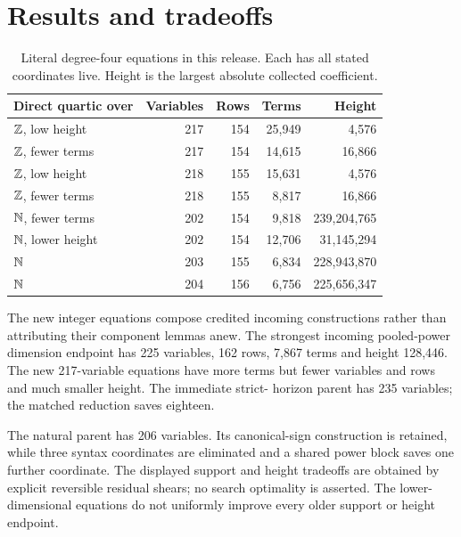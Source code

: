 \section{Results and tradeoffs}
\begin{table}[ht]
\centering\small
\begin{tabular}{lrrrr}
\toprule
Direct quartic over & Variables & Rows & Terms & Height\\
\midrule
$\mathbb Z$, low height &217&154&25,949&4,576\\
$\mathbb Z$, fewer terms &217&154&14,615&16,866\\
$\mathbb Z$, low height &218&155&15,631&4,576\\
$\mathbb Z$, fewer terms &218&155&8,817&16,866\\
$\mathbb N$, fewer terms &202&154&9,818&239,204,765\\
$\mathbb N$, lower height &202&154&12,706&31,145,294\\
$\mathbb N$ &203&155&6,834&228,943,870\\
$\mathbb N$ &204&156&6,756&225,656,347\\
\bottomrule
\end{tabular}
\caption{Literal degree-four equations in this release. Each has all stated
coordinates live. Height is the largest absolute collected coefficient.}
\end{table}
The new integer equations compose credited incoming constructions rather
than attributing their component lemmas anew. The strongest incoming
pooled-power dimension endpoint has 225 variables, 162 rows, 7,867 terms
and height 128,446. The new 217-variable equations have more terms but
fewer variables and rows and much smaller height. The immediate strict-
horizon parent has 235 variables; the matched reduction saves eighteen.

The natural parent has 206 variables. Its canonical-sign construction
is retained, while three syntax coordinates are eliminated and a shared
power block saves one further coordinate. The displayed support and height
tradeoffs are obtained by explicit reversible residual shears; no search
optimality is asserted. The lower-dimensional equations do not uniformly
improve every older support or height endpoint.

